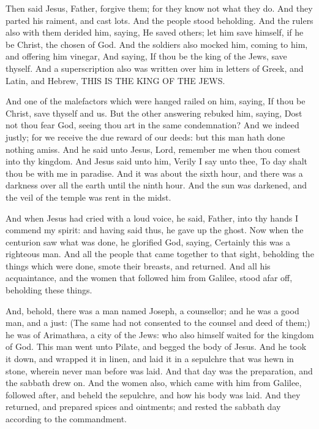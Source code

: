  Then said Jesus, Father, forgive them; for they know not
what they do. And they parted his raiment, and cast lots.
 And the people stood beholding. And the rulers also with
them derided him, saying, He saved others; let him save himself, if he
be Christ, the chosen of God.  And the soldiers also
mocked him, coming to him, and offering him vinegar,  And
saying, If thou be the king of the Jews, save thyself. 
And a superscription also was written over him in letters of Greek, and
Latin, and Hebrew, THIS IS THE KING OF THE JEWS.

 And one of the malefactors which were hanged railed on
him, saying, If thou be Christ, save thyself and us.  But
the other answering rebuked him, saying, Dost not thou fear God, seeing
thou art in the same condemnation?  And we indeed justly;
for we receive the due reward of our deeds: but this man hath done
nothing amiss.  And he said unto Jesus, Lord, remember me
when thou comest into thy kingdom.  And Jesus said unto
him, Verily I say unto thee, To day shalt thou be with me in paradise.
 And it was about the sixth hour, and there was a
darkness over all the earth until the ninth hour.  And
the sun was darkened, and the veil of the temple was rent in the midst.

 And when Jesus had cried with a loud voice, he said,
Father, into thy hands I commend my spirit: and having said thus, he
gave up the ghost.  Now when the centurion saw what was
done, he glorified God, saying, Certainly this was a righteous man.
 And all the people that came together to that sight,
beholding the things which were done, smote their breasts, and returned.
 And all his acquaintance, and the women that followed
him from Galilee, stood afar off, beholding these things.

 And, behold, there was a man named Joseph, a counsellor;
and he was a good man, and a just:  (The same had not
consented to the counsel and deed of them;) he was of Arimathæa, a city
of the Jews: who also himself waited for the kingdom of God.
 This man went unto Pilate, and begged the body of Jesus.
 And he took it down, and wrapped it in linen, and laid
it in a sepulchre that was hewn in stone, wherein never man before was
laid.  And that day was the preparation, and the sabbath
drew on.  And the women also, which came with him from
Galilee, followed after, and beheld the sepulchre, and how his body was
laid.  And they returned, and prepared spices and
ointments; and rested the sabbath day according to the commandment.

